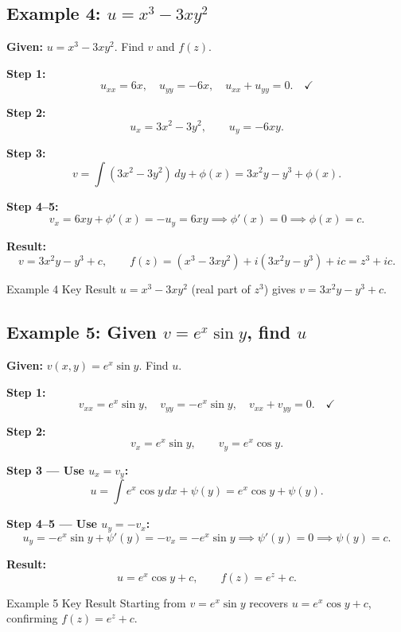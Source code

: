 \documentclass[12pt,a4paper]{article}
\begin{document}
\subsection*{Example 4: $u = x^3 - 3xy^2$}

\textbf{Given:} $u=x^3-3xy^2$. Find $v$ and $f(z)$.

\medskip
\textbf{Step 1:}
\[
  u_{xx}=6x,\quad u_{yy}=-6x,\quad u_{xx}+u_{yy}=0.\quad\checkmark
\]

\textbf{Step 2:}
\[
  u_x=3x^2-3y^2,\qquad u_y=-6xy.
\]

\textbf{Step 3:}
\[
  v=\int(3x^2-3y^2)\,dy+\phi(x)=3x^2y-y^3+\phi(x).
\]

\textbf{Step 4--5:}
\[
  v_x=6xy+\phi'(x)=-u_y=6xy \implies \phi'(x)=0 \implies \phi(x)=c.
\]

\textbf{Result:}
\[
  \boxed{v=3x^2y-y^3+c,\qquad f(z)=(x^3-3xy^2)+i(3x^2y-y^3)+ic=z^3+ic.}
\]

\begin{learnbox}{Example 4 Key Result}
$u=x^3-3xy^2$ (real part of $z^3$) gives $v=3x^2y-y^3+c$.
\end{learnbox}

\subsection*{Example 5: Given $v = e^x\sin y$, find $u$}

\textbf{Given:} $v(x,y)=e^x\sin y$. Find $u$.

\medskip
\textbf{Step 1:}
\[
  v_{xx}=e^x\sin y,\quad v_{yy}=-e^x\sin y,\quad v_{xx}+v_{yy}=0.\quad\checkmark
\]

\textbf{Step 2:}
\[
  v_x=e^x\sin y,\qquad v_y=e^x\cos y.
\]

\textbf{Step 3 --- Use $u_x=v_y$:}
\[
  u=\int e^x\cos y\,dx+\psi(y)=e^x\cos y+\psi(y).
\]

\textbf{Step 4--5 --- Use $u_y=-v_x$:}
\[
  u_y=-e^x\sin y+\psi'(y)=-v_x=-e^x\sin y \implies \psi'(y)=0 \implies \psi(y)=c.
\]

\textbf{Result:}
\[
  \boxed{u=e^x\cos y+c,\qquad f(z)=e^z+c.}
\]

\begin{learnbox}{Example 5 Key Result}
Starting from $v=e^x\sin y$ recovers $u=e^x\cos y+c$, confirming $f(z)=e^z+c$.
\end{learnbox}
\end{document}
